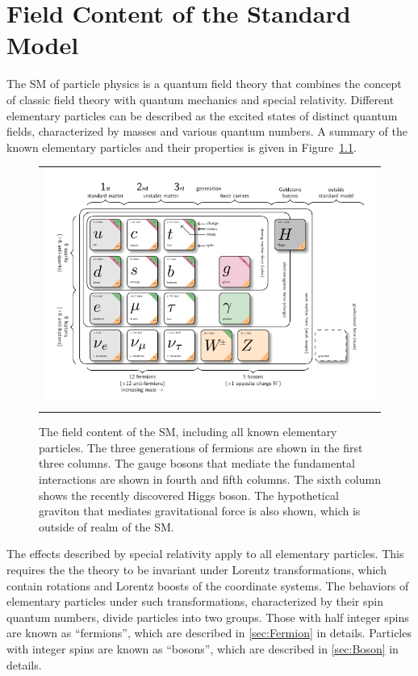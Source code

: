 \chapter{Field Content of the Standard Model}
\label{sec:Field}

The \ac{SM} of particle physics is a quantum field theory that combines the concept of classic field theory with quantum mechanics and special relativity. Different elementary particles can be described as the excited states of distinct quantum fields, characterized by masses and various quantum numbers. A summary of the known elementary particles and their properties is given in Figure~\ref{fig:Field}.

\begin{figure}[tbh!]
 \begin{center}
 \begin{tabular}{c}
 \includegraphics[width=\textwidth]{figures/Part1/Field/SM}
 \end{tabular}
 \caption{The field content of the \ac{SM}, including all known elementary particles. The three generations of fermions are shown in the first three columns. The gauge bosons that mediate the fundamental interactions are shown in fourth and fifth columns. The sixth column shows the recently discovered Higgs boson. The hypothetical graviton that mediates gravitational force is also shown, which is outside of realm of the \ac{SM}.~\cite{tikz:SM}}
 \label{fig:Field}
 \end{center}
\end{figure}

The effects described by special relativity apply to all elementary particles. This requires the the theory to be invariant under Lorentz transformations, which contain rotations and Lorentz boosts of the coordinate systems. The behaviors of elementary particles under such transformations, characterized by their spin quantum numbers, divide particles into two groups. Those with half integer spins are known as ``fermions'', which are described in \ref{sec:Fermion} in details. Particles with integer spins are known as ``bosons'', which are described in \autoref{sec:Boson} in details. 

